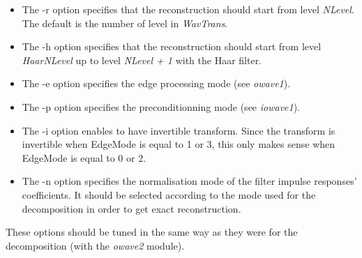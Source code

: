 \begin{itemize}
\item
The -r option specifies that the reconstruction should start from level 
{\em NLevel}. The default is the number of level in {\em WavTrans}. 
\item
The -h option specifies that the reconstruction should start from level 
{\em HaarNLevel} up to level {\em NLevel + 1} with the Haar filter. 
\item
The -e option specifies the edge processing mode (see {\em owave1}).
\item
The -p option specifies the preconditionning mode (see {\em iowave1}).
\item
The -i option enables to have invertible transform. Since the transform is invertible when EdgeMode is equal to 1 or 3, this only makes sense when EdgeMode is equal to 0 or 2. 
\item
The -n option specifies the normalisation mode of the filter impulse responses' coefficients. It should be selected according to the mode used for the decomposition in order to get exact reconstruction. 
\end{itemize}

These options should be tuned in the same way as they were 
for the decomposition (with the {\em owave2} module). 

